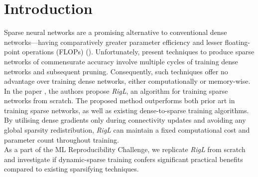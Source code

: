 \section{Introduction}


Sparse neural networks are a promising alternative to conventional dense networks---having comparatively greater parameter efficiency and lesser floating-point operations (FLOPs) (\citet{han2016eie,ashbyexploiting,Srinivas_2017_CVPR_Workshops}). Unfortunately, present techniques to produce sparse networks of commensurate accuracy involve multiple cycles of training dense networks and subsequent pruning. Consequently, such techniques offer no advantage over training dense networks, either computationally or memory-wise. \\

In the paper \citet{rigl}, the authors propose \textit{RigL}, an algorithm for training sparse networks from scratch. The proposed method outperforms both prior art in training sparse networks, as well as existing dense-to-sparse training algorithms. By utilising dense gradients only during connectivity updates and avoiding any global sparsity redistribution, \textit{RigL} can maintain a fixed computational cost and parameter count throughout training.\\

As a part of the ML Reproducibility Challenge, we replicate \textit{RigL} from scratch and investigate if dynamic-sparse training confers significant practical benefits compared to existing sparsifying techniques.